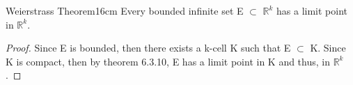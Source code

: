 	\vspace{0.5cm}



	\begin{wtheorem}{Weierstrass Theorem}{16cm}
		Every bounded infinite set E $\subset$ $\mathbb{R}^k$ has
		a limit point in $\mathbb{R}^k$.
	\end{wtheorem}
	
	\begin{proof}
		Since E is bounded, then there exists a k-cell K such that
		E $\subset$ K.
		Since K is compact, then by {\color{red} theorem 6.3.10},
		E has a limit point in K and thus, in $\mathbb{R}^k$.	
	\end{proof}




